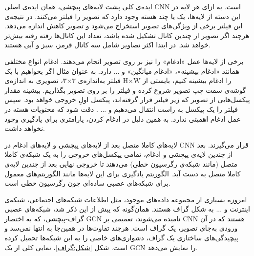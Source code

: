ایده‌ی کلی پشت لایه‌های پیچشی، همان ایده‌ی اصلی CNN است. به ازای هر لایه در این دسته از لایه‌ها، یک یا چند هسته وجود دارد که تصویر را فیلتر می‌کنند. در نتیجه‌ی این فیلتر برخی از ویژگی‌های تصویر استخراج می‌شود و تصویر کاهش اندازه می‌دهد. هرچند اگر تصویر از چندین کانال تشکیل شده باشد، تعداد این کانال‌ها رفته رفته بیش‌تر خواهد شد. در ابتدا اکثر تصاویر شامل سه کانال قرمز، سبز و آبی هستند. 



برخی از لایه‌ها عمل «ادغام» را نیز بر روی تصویر انجام می‌دهند. ادغام انواع مختلفی همانند «ادغام بیشینه»، «ادغام میانگین» و ... دارد. به عنوان مثال اگر بخواهیم با یک فیلتر به‌اندازه‌ی ۳×۳، تصویری به اندازه‌ی H×W را ادغام بیشینه کنیم، بایستی از گوشه‌ی سمت چپ تصویر شروع کرده و فیلتر را بر روی تصویر بگذاریم. بیشینه مقدار پیکسل‌هایی از تصویر که زیر فیلتر قرار گرفته‌اند، پیکسل اولِ خروجی خواهد بود. سپس فیلتر را یک پیکسل به راست انتقال می‌دهیم و ... . دقت شود که محتویات هسته در عمل ادغام اهمیتی ندارد. به همین دلیل در ادغام کردن، پارامتری برای یادگیری وجود نخواهد داشت. 



لایه‌های کاملا متصل بعد از لایه‌های پیچشی و لایه‌های ادغام در CNN قرار می‌گیرند. بعد از چندین لایه‌ی پیچشی و ادغام، تمامی پیکسل‌های خروجی را به یک شبکه‌ی کاملا متصل (مانند شبکه‌ی رگرسیون خطی) می‌دهند تا خروجی نهایی بعد از چندین لایه‌ی کاملا متصل به دست آید. الگوریتم یادگیری برای این لایه‌ها مانند الگوریتم‌های معمول برای شبکه‌های عصبی ساده‌ای چون رگرسیون خطی است. 









امروزه بسیاری از مجموعه ‌داده‌های موجود، مثل اطلاعات شبکه‌های اجتماعی، شبکه‌ی اینترنت و ... به شکل گراف هستند.\cite{gcn_paper} همان‌گونه که پیش‌ از این ذکر شد، شبکه‌های عصبی گراف-پیچشی، که به اختصار GCN نامیده می‌شوند، تعمیمی بر CNN هستند که در آن ورودی به‌جای تصویر، یک گراف است. هرچند تفاوت‌ها در همین‌جا به انتها نمی‌سد و پیچیدگی‌های ساختاری یک گراف، دشواری‌های خاصی را به این شبکه‌ها تحمیل کرده است. شکل \ref{شکل:گراف}، نمایی کلی از یک GCN را نمایش می‌دهد. 

